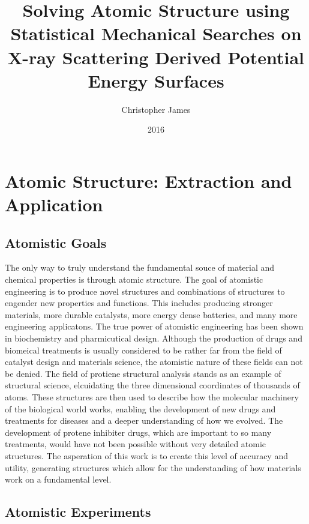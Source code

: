 \documentclass{uscthesis}
\title{Solving Atomic Structure using Statistical Mechanical Searches on X-ray Scattering Derived Potential Energy Surfaces}
\author{Christopher James}{Wright}    %
\date{2016}                      %
\theoremstyle{definition}
\theoremstyle{plain}
\begin{document}


\chapter{Atomic Structure: Extraction and Application}
\section{Atomistic Goals}
The only way to truly understand the fundamental souce of material and chemical properties is through atomic structure.
The goal of atomistic engineering is to produce novel structures and combinations of structures to engender new properties and functions.
This includes producing stronger materials, more durable catalysts, more energy dense batteries, and many more engineering applicatons.
The true power of atomistic engineering has been shown in biochemistry and pharmicutical design.
Although the production of drugs and biomeical treatments is usually considered to be rather far from the field of catalyst design and materials science, the atomistic nature of these fields can not be denied.
The field of protiene structural analysis stands as an example of structural science, elcuidating the three dimensional coordinates of thousands of atoms.
These structures are then used to describe how the molecular machinery of the biological world works, enabling the development of new drugs and treatments for diseases and a deeper understanding of how we evolved.
The development of protene inhibiter drugs, which are important to so many treatments, would have not been possible without very detailed atomic structures.
The asperation of this work is to create this level of accuracy and utility, generating structures which allow for the understanding of how materials work on a fundamental level.
\section{Atomistic Experiments}
\end{document}
